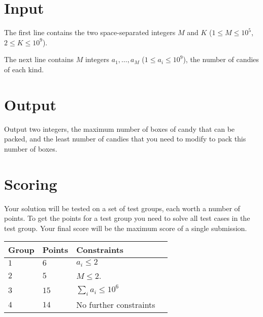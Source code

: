 \section*{Input}
The first line contains the two space-separated integers $M$ and $K$ ($1 \le M \le 10^5$, $2 \le K \le 10^9$).

The next line contains $M$ integers $a_1, \dots, a_M$ ($1 \le a_i \le 10^9$), the number of candies of each kind.

\section*{Output}
Output two integers, the maximum number of boxes of candy that can be packed, and the least number of candies that you need to modify to pack this number of boxes.

\section*{Scoring}
Your solution will be tested on a set of test groups, each worth a number of points.
To get the points for a test group you need to solve all test cases in the test group.
Your final score will be the maximum score of a single submission.

\noindent
\begin{tabular}{| l | l | l | l |}
\hline
Group & Points & Constraints \\ \hline
$1$   & $6$    & $a_i \le 2$ \\ \hline
$2$   & $5$    & $M \le 2$. \\ \hline
$3$   & $15$   & $\sum_i{a_i} \le 10^6$\\ \hline
$4$   & $14$   & No further constraints\\ \hline
\end{tabular}
